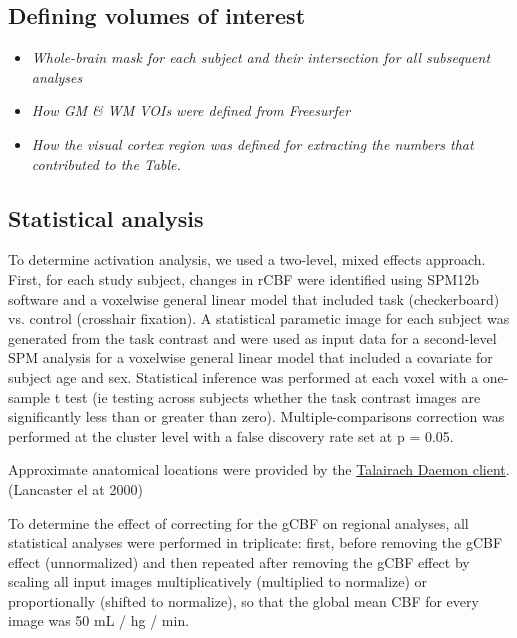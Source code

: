 \subsection{Defining volumes of interest}
\begin{itemize}
\item \textit{Whole-brain mask for each subject and their intersection for all subsequent analyses}
\item \textit{How GM & WM VOIs were defined from Freesurfer}
\item \textit{How the visual cortex region was defined for extracting the numbers that contributed to the Table.}
\end{itemize}

\subsection{Statistical analysis}
To determine activation analysis, we used a two-level, mixed effects approach.  First, for each study subject, changes in rCBF were identified using SPM12b software and a voxelwise general linear model that included task (checkerboard) vs. control (crosshair fixation). A statistical parametic image for each subject was generated from the task contrast and were used as input data for a second-level SPM analysis for a voxelwise general linear model that included a covariate for subject age and sex. Statistical inference was performed at each voxel with a one-sample t test (ie testing across subjects whether the task contrast images are significantly less than or greater than zero). 
Multiple-comparisons correction was performed at the cluster level with a false discovery rate set at p = 0.05. 

Approximate anatomical locations were provided by the \href{http://www.talairach.org}{Talairach Daemon client}.(Lancaster el at 2000)

To determine the effect of correcting for the gCBF on regional analyses, all statistical analyses were performed in triplicate: first, before removing the gCBF effect (unnormalized) and then repeated after removing the gCBF effect by scaling all input images multiplicatively (multiplied to normalize) or proportionally (shifted to normalize), so that the global mean CBF for every image was 50 mL / hg / min.






